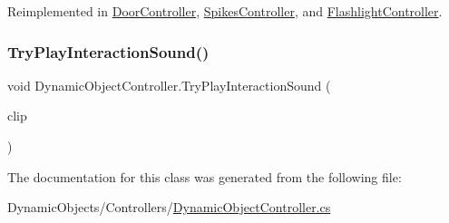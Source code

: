 Reimplemented in \mbox{\hyperlink{class_door_controller_a8da71e19b95345820ad936a20bce14dc}{Door\+Controller}}, \mbox{\hyperlink{class_spikes_controller_aab3fd43128a06340e93256838a971535}{Spikes\+Controller}}, and \mbox{\hyperlink{class_flashlight_controller_abc32336593ebdc56f906399f940c542d}{Flashlight\+Controller}}.

\mbox{\label{class_dynamic_object_controller_a923cc1baa90750f9df291a5c33c310b5}} 
\subsubsection{\texorpdfstring{Try\+Play\+Interaction\+Sound()}{TryPlayInteractionSound()}}
{\footnotesize\ttfamily void Dynamic\+Object\+Controller.\+Try\+Play\+Interaction\+Sound (\begin{DoxyParamCaption}\item[{Audio\+Clip}]{clip }\end{DoxyParamCaption})\hspace{0.3cm}{\ttfamily [protected]}}



The documentation for this class was generated from the following file\+:\begin{DoxyCompactItemize}
\item 
Dynamic\+Objects/\+Controllers/\mbox{\hyperlink{_dynamic_object_controller_8cs}{Dynamic\+Object\+Controller.\+cs}}\end{DoxyCompactItemize}
